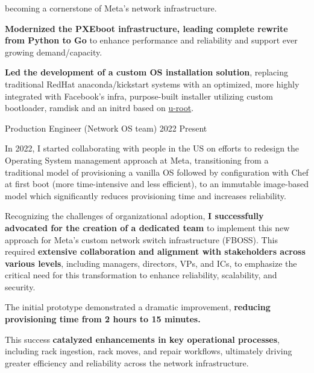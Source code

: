 \begin{cventries}
{\begin{cvitems}
{                  becoming a cornerstone of Meta's network infrastructure.}
      \item {\textbf{Modernized the PXEboot infrastructure, leading complete rewrite from Python
                    to Go} to enhance performance and reliability and support ever growing demand/capacity.}
      \item {\textbf{Led the development of a custom OS installation solution}, replacing traditional RedHat
                  anaconda/kickstart systems with an optimized, more highly integrated with Facebook's infra, purpose-built installer utilizing custom bootloader, ramdisk and an initrd based on \href{https://github.com/u-root/u-root}{u-root}.}
    \end{cvitems}
  }

  \cventryprevrole
  {Production Engineer (Network OS team)}
  {2022 \newline Present}
  {
    In 2022, I started collaborating with people in the US on efforts to redesign the Operating System management approach at Meta, transitioning from a traditional model of provisioning a vanilla OS followed by configuration with Chef at first boot (more time-intensive and less efficient), to an immutable image-based model which
    significantly reduces provisioning time and increases reliability.
    \vspace{2mm}
    \begin{cvitems}
      \item Recognizing the challenges of organizational adoption, \textbf{I successfully advocated for the creation of a dedicated team} to implement this new approach for Meta's custom network switch infrastructure (FBOSS). This required \textbf{extensive collaboration and alignment with stakeholders across various levels}, including managers, directors, VPs, and ICs, to emphasize the critical need for this transformation to enhance reliability, scalability, and security.
      \item The initial prototype demonstrated a dramatic improvement, \textbf{reducing provisioning time from 2 hours to 15 minutes.}
      \item This success \textbf{catalyzed enhancements in key operational processes}, including rack ingestion, rack moves, and repair workflows, ultimately driving greater efficiency and reliability across the network infrastructure.
    \end{cvitems}
  }


\end{cventries}
